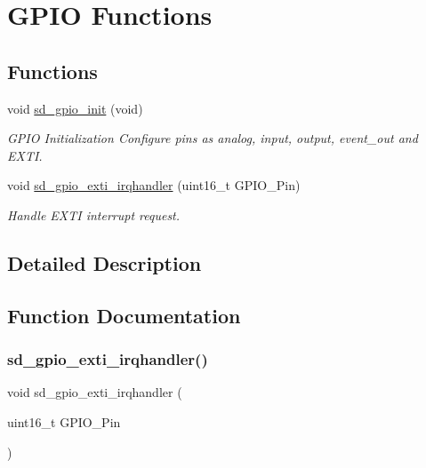 \hypertarget{group___s_d___g_p_i_o___functions}{}\section{G\+P\+IO Functions}
\label{group___s_d___g_p_i_o___functions}
\subsection*{Functions}
\begin{DoxyCompactItemize}
\item 
void \mbox{\hyperlink{group___s_d___g_p_i_o___functions_ga8e151b8cf065d8de5eb8f4908b18072b}{sd\+\_\+gpio\+\_\+init}} (void)
\begin{DoxyCompactList}\small\item\em G\+P\+IO Initialization Configure pins as analog, input, output, event\+\_\+out and E\+X\+TI. \end{DoxyCompactList}\item 
void \mbox{\hyperlink{group___s_d___g_p_i_o___functions_gad80abe67b4fa71703ee86cfc9c6f98ce}{sd\+\_\+gpio\+\_\+exti\+\_\+irqhandler}} (uint16\+\_\+t G\+P\+I\+O\+\_\+\+Pin)
\begin{DoxyCompactList}\small\item\em Handle E\+X\+TI interrupt request. \end{DoxyCompactList}\end{DoxyCompactItemize}


\subsection{Detailed Description}


\subsection{Function Documentation}
\mbox{\label{group___s_d___g_p_i_o___functions_gad80abe67b4fa71703ee86cfc9c6f98ce}} 
\subsubsection{\texorpdfstring{sd\+\_\+gpio\+\_\+exti\+\_\+irqhandler()}{sd\_gpio\_exti\_irqhandler()}}
{\footnotesize\ttfamily void sd\+\_\+gpio\+\_\+exti\+\_\+irqhandler (\begin{DoxyParamCaption}\item[{uint16\+\_\+t}]{G\+P\+I\+O\+\_\+\+Pin }\end{DoxyParamCaption})}



